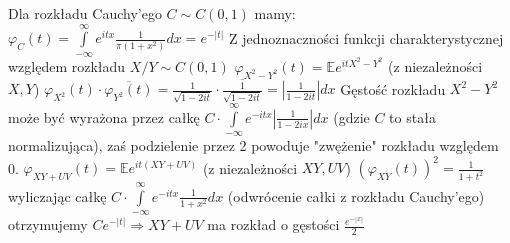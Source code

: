 \documentclass{article}
\begin{document}
Dla rozkładu Cauchy'ego $C\sim C(0,1)$ mamy:\newline
$\varphi_{C}(t)=\int\limits_{-\infty}^{\infty}e^{itx}\frac{1}{\pi(1+x^2)}dx=e^{-|t|}$\newline
Z jednoznaczności funkcji charakterystycznej względem rozkładu $X/Y\sim C(0,1)$\newline
$\varphi_{X^2-Y^2}(t)=\mathbb{E}e^{itX^2-Y^2}$ (z niezależności $X,Y$)
$\varphi_{X^2}(t)\cdot\overline{\varphi_{Y^2}(t)}=\frac{1}{\sqrt{1-2it}}\cdot\overline{\frac{1}{\sqrt{1-2it}}}=\left|\frac{1}{1-2it}\right|dx$\newline
Gęstość rozkładu $X^2-Y^2$ może być wyrażona przez całkę $C\cdot\int\limits_{-\infty}^{\infty}e^{-itx}\left|\frac{1}{1-2ix}\right|dx$ (gdzie $C$ to stała normalizująca),
zaś podzielenie przez 2 powoduje "zwężenie" rozkładu względem 0.\newline
$\varphi_{XY+UV}(t)=\mathbb{E}e^{it(XY+UV)}$ (z niezależności $XY,UV$)
$(\varphi_{XY}(t))^2=\frac{1}{1+t^2}$ wyliczając całkę $C\cdot\int\limits_{-\infty}^{\infty}e^{-itx}\frac{1}{1+x^2}dx$ (odwrócenie całki z rozkładu Cauchy'ego)
otrzymujemy $Ce^{-|t|}\Rightarrow XY+UV$ ma rozkład o gęstości $\frac{e^{-|x|}}{2}$
\end{document}
